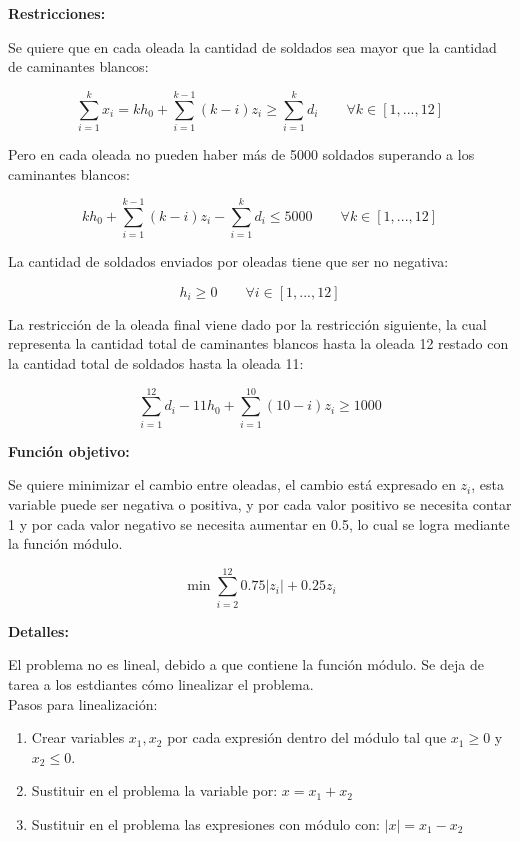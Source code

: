 \documentclass[a4paper,10pt,twocolumn]{article}
\theoremstyle{theorem}
\theoremstyle{definition}
\theoremstyle{remark}
\begin{document}
\textbf{Restricciones:}

Se quiere que en cada oleada la cantidad de soldados sea mayor que la cantidad de caminantes blancos:

$$
\sum_{i=1}^{k} x_i = k h_0 + \sum_{i=1}^{k-1}(k-i)z_i \ge \sum_{i=1}^k d_i \qquad \forall k \in [1,...,12]
$$

Pero en cada oleada no pueden haber más de 5000 soldados superando a los caminantes blancos:

$$
k h_0 + \sum_{i=1}^{k-1}(k-i)z_i - \sum_{i=1}^k d_i \le 5000 \qquad \forall k \in [1,...,12]
$$

La cantidad de soldados enviados por oleadas tiene que ser no negativa:

$$
h_i \ge 0 \qquad \forall i \in [1,...,12]
$$

La restricción de la oleada final viene dado por la restricción siguiente, la cual representa la cantidad total de caminantes blancos hasta la oleada 12 restado con la cantidad total de soldados hasta la oleada 11:

$$
\sum_{i=1}^{12} d_i - 11 h_0 + \sum_{i=1}^{10}(10-i)z_i \ge 1000
$$

\textbf{Función objetivo:}

Se quiere minimizar el cambio entre oleadas, el cambio está expresado en $z_i$, esta variable puede ser negativa o positiva, y por cada valor
positivo se necesita contar 1 y por cada valor negativo se necesita aumentar en 0.5, lo cual se logra mediante la función módulo.

$$
\min \sum_{i=2}^{12} 0.75 |z_i| + 0.25 z_i
$$

\textbf{Detalles:}

El problema no es lineal, debido a que contiene la función módulo. Se deja de tarea a los estdiantes cómo linealizar el problema.\\

Pasos para linealización:

\renewcommand{\theenumi}{\arabic{enumi}} %
\begin{enumerate}
	\item Crear variables $x_1, x_2$ por cada expresión dentro del módulo tal que $x_1 \ge 0$ y $x_2 \le 0$.
	\item Sustituir en el problema la variable por: $x = x_1 + x_2$
	\item Sustituir en el problema las expresiones con módulo con: $|x| = x_1 - x_2$
\end{enumerate}
\end{document}
